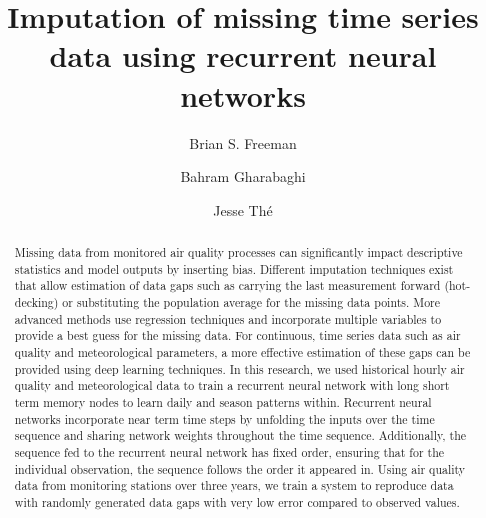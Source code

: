 \documentclass[preprint,12pt,authoryear]{elsarticle}
\title{Imputation of missing time series data using recurrent neural networks}
\begin{document}
\maketitle

\begin{linenumbers}
\begin{frontmatter}

\author[guelph]{Brian S. Freeman}

\author[guelph]{Bahram Gharabaghi}

\author[lakes]{Jesse Th\'e }


\address[guelph]{School of Engineering, University of Guelph, Guelph, Ontario, N1G 2W1, Canada}
\address[lakes]{Lakes Environmental, 170 Columbia St W, Waterloo, Ontario, N2L 3L3 Canada}


\begin{abstract}
Missing data from monitored air quality processes can significantly impact descriptive statistics and model outputs by inserting bias. Different imputation techniques exist that allow estimation of data gaps such as carrying the last measurement forward (hot-decking) or substituting the population average for the missing data points. More advanced methods use regression techniques and incorporate multiple variables to provide a best guess for the missing data. For continuous, time series data such as air quality and meteorological parameters, a more effective estimation of these gaps can be provided using deep learning techniques. In this research, we used historical hourly air quality and meteorological data to train a recurrent neural network with long short term memory nodes to learn daily and season patterns within.  Recurrent neural networks incorporate near term time steps by unfolding the inputs over the time sequence and sharing network weights throughout the time sequence. Additionally, the sequence fed to the recurrent neural network has fixed order, ensuring that for the individual observation, the sequence follows the order it appeared in. Using air quality data from monitoring stations over three years, we train a system to reproduce data with randomly generated data gaps with very low error compared to observed values.
\\ 


\end{abstract}
\end{frontmatter}
\end{linenumbers}
\end{document}
